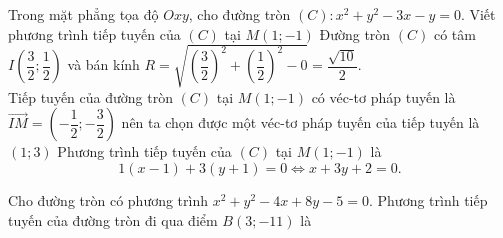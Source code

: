 \begin{bt}%
	 Trong mặt phẳng tọa độ $Oxy$, cho đường tròn $(C)\colon x^2+y^2-3x-y=0$. Viết phương trình tiếp tuyến của $(C)$ tại $M(1;-1)$ 
	\loigiai
	{Đường tròn $(C)$ có tâm $I\left(\dfrac{3}{2};\dfrac{1}{2}\right)$ và bán kính $R=\sqrt{\left(\dfrac{3}{2}\right)^2+\left(\dfrac{1}{2}\right)^2-0} = \dfrac{\sqrt{10}}{2}$.\\
	Tiếp tuyến của đường tròn $(C)$ tại $M(1;-1)$ có véc-tơ pháp tuyến là $\overrightarrow{IM}=\left(-\dfrac{1}{2};-\dfrac{3}{2}\right)$ nên ta chọn được một véc-tơ pháp tuyến của tiếp tuyến là $(1;3)$
	Phương trình tiếp tuyến của $(C)$ tại $M(1;-1)$ là
	$$1(x-1)+3(y+1)=0 \Leftrightarrow x+3y+2=0.$$
	}
\end{bt}

\begin{bt}%
	Cho đường tròn có phương trình $x^2+y^2-4x+8y-5=0$. Phương trình tiếp tuyến của đường tròn đi qua điểm $B(3;-11)$ là

\end{bt}

